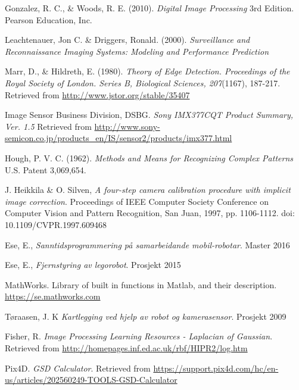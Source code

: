 \begin{thebibliography}{99}
    Gonzalez, R. C., \& Woods, R. E. (2010). \emph{Digital Image Processing} 3rd Edition. Pearson Education, Inc.
    
	Leachtenauer, Jon C.  \& Driggers, Ronald. (2000). \emph{Surveillance and Reconnaissance Imaging Systems: Modeling and Performance Prediction}
    
	Marr, D., \& Hildreth, E. (1980). \emph{Theory of Edge Detection. Proceedings of the Royal Society of London. Series B, Biological Sciences, 207}(1167), 187-217. Retrieved from \url{http://www.jstor.org/stable/35407}

	Image Sensor Business Division, DSBG. \emph{Sony IMX377CQT Product Summary, Ver. 1.5} Retrieved from \url{http://www.sony-semicon.co.jp/products_en/IS/sensor2/products/imx377.html}
    
	Hough, P. V. C. (1962). \emph{Methods and Means for Recognizing Complex Patterns} U.S. Patent 3,069,654.
    
	J. Heikkila \& O. Silven, \emph{A four-step camera calibration procedure with implicit image correction}. Proceedings of IEEE Computer Society Conference on Computer Vision and Pattern Recognition, San Juan, 1997, pp. 1106-1112.
doi: 10.1109/CVPR.1997.609468

	Ese, E., \emph{Sanntidsprogrammering på samarbeidande mobil-robotar}. Master 2016
    
	Ese, E., \emph{Fjernstyring av legorobot}. Prosjekt 2015
    
	MathWorks. Library of built in functions in Matlab, and their description. \url{https://se.mathworks.com}
    
	Tøraasen, J. K \emph{Kartlegging ved hjelp av robot og kamerasensor}. Prosjekt 2009
    
	Fisher, R. \emph{Image Processing Learning Resources - Laplacian of Gaussian}. Retrieved from \url{http://homepages.inf.ed.ac.uk/rbf/HIPR2/log.htm}

	Pix4D. \emph{GSD Calculator}. Retrieved from \url{https://support.pix4d.com/hc/en-us/articles/202560249-TOOLS-GSD-Calculator}
    
\end{thebibliography}